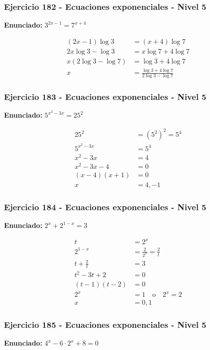 \documentclass[12pt,a4paper]{article}
\begin{document}
\subsubsection*{Ejercicio 182 - Ecuaciones exponenciales - Nivel 5}
\textbf{Enunciado:} \(3^{2x-1}=7^{x+4}\)

\[
\begin{aligned}
(2x-1)\log3&=(x+4)\log7\\
2x\log3-\log3&=x\log7+4\log7\\
x(2\log3-\log7)&=\log3+4\log7\\
x&=\boxed{\frac{\log3+4\log7}{2\log3-\log7}}
\end{aligned}
\]


\subsubsection*{Ejercicio 183 - Ecuaciones exponenciales - Nivel 5}
\textbf{Enunciado:} \(5^{x^2-3x}=25^2\)

\[
\begin{aligned}
25^2&=(5^2)^2=5^4\\
5^{x^2-3x}&=5^4\\
x^2-3x&=4\\
x^2-3x-4&=0\\
(x-4)(x+1)&=0\\
x&=\boxed{4,-1}
\end{aligned}
\]


\subsubsection*{Ejercicio 184 - Ecuaciones exponenciales - Nivel 5}
\textbf{Enunciado:} \(2^x+2^{1-x}=3\)

\[
\begin{aligned}
t&=2^x\\
2^{1-x}&=\frac2{2^x}=\frac2t\\
t+\frac2t&=3\\
t^2-3t+2&=0\\
(t-1)(t-2)&=0\\
2^x&=1\quad \text{o}\quad 2^x=2\\
x&=\boxed{0,1}
\end{aligned}
\]


\subsubsection*{Ejercicio 185 - Ecuaciones exponenciales - Nivel 5}
\textbf{Enunciado:} \(4^x-6\cdot 2^x+8=0\)
\end{document}
